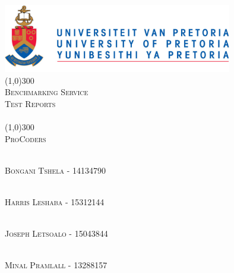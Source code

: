 \documentclass[runningheads,a4paper]{article}
\begin{document}
	
\begin{titlepage}
	\begin{center}
		\includegraphics[width=10cm]{../Images/UP_Logo.PNG}  \\
		[1cm]
		\line(1,0){300} \\
		[0.3cm]
		\textsc{\Large
			Benchmarking Service\\
			Test Reports\\
			\hfill
		}\\
		[0.1cm]
		\line(1,0){300} \\
		[0.7cm]
		\textsc{\Large
			ProCoders
		} \\
	\end{center}
	
	\begin{center}
		\begin{centre}
			\textsc{\large\\
				Bongani Tshela - 14134790\\ 
			}
		
			\textsc{\large\\
				Harris Leshaba - 15312144\\ 
			}

			\textsc{\large\\
				Joseph Letsoalo - 15043844\\ 
			}
			
			\textsc{\large\\
				Minal Pramlall - 13288157\\ 
			}
			
		

            

		\end{centre}
		
		
		
	\end{center}
\end{titlepage}

\begingroup

\tableofcontents
{}
\endgroup
\newpage
\end{document}
